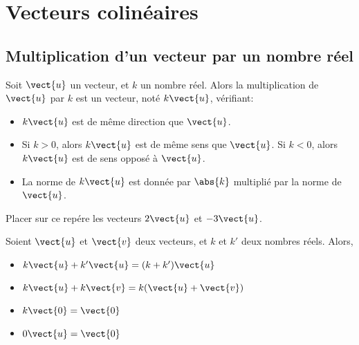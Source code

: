 \documentclass{article}
\begin{document}
\section{Vecteurs colinéaires}

\subsection{Multiplication d'un vecteur par un nombre réel}

\begin{tcolorbox}
\begin{definition}
Soit $\vect{u}$ un vecteur, et $k$ un nombre réel. Alors la multiplication de $\vect{u}$ par $k$ est un vecteur, noté $k\vect{u}$, vérifiant:
\begin{itemize}
\item $k\vect{u}$ est de même direction que $\vect{u}$.
\item Si $k > 0$, alors $k\vect{u}$ est de même sens que $\vect{u}$. Si $k < 0$, alors $k\vect{u}$ est de sens opposé à $\vect{u}$.
\item La norme de $k\vect{u}$ est donnée par $\abs{k}$ multiplié par la norme de $\vect{u}$.
\end{itemize}        
\end{definition}
\end{tcolorbox}
\begin{example}
Placer sur ce repére les vecteurs $2\vect{u}$ et $-3\vect{u}$.

\begin{center}
\end{center}
\end{example}

\begin{proposition}
Soient $\vect{u}$ et $\vect{v}$ deux vecteurs, et $k$ et $k'$ deux nombres réels. Alors,
\begin{itemize}
\item $k \vect{u} + k' \vect{u} = (k + k') \vect{u}$
\item $k \vect{u} + k \vect{v} = k (\vect{u} + \vect{v})$
\item $k \vect{0} = \vect{0}$
\item $0 \vect{u} = \vect{0}$
\end{itemize}
\end{proposition}
\end{document}
